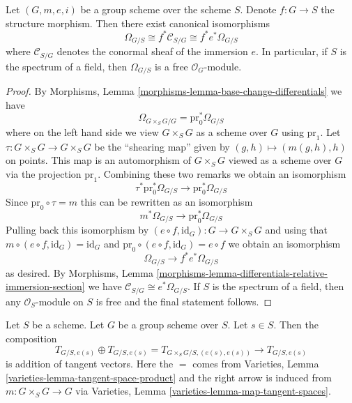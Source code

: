 \begin{lemma}
\label{lemma-group-scheme-module-differentials}
\begin{reference}
\cite[Proposition 3.15]{BookAV}
\end{reference}
Let $(G, m, e, i)$ be a group scheme over the scheme $S$.
Denote $f : G \to S$ the structure morphism.
Then there exist canonical isomorphisms
$$
\Omega_{G/S} \cong f^*\mathcal{C}_{S/G} \cong f^*e^*\Omega_{G/S}
$$
where $\mathcal{C}_{S/G}$ denotes the conormal sheaf of the
immersion $e$. In particular, if $S$ is the spectrum of a field, then
$\Omega_{G/S}$ is a free $\mathcal{O}_G$-module.
\end{lemma}

\begin{proof}
By Morphisms, Lemma \ref{morphisms-lemma-base-change-differentials} we have
$$
\Omega_{G \times_S G/G} = \text{pr}_0^*\Omega_{G/S}
$$
where on the left hand side we view $G \times_S G$ as a scheme over $G$
using $\text{pr}_1$.
Let $\tau : G \times_S G \to G \times_S G$ be the ``shearing map''
given by $(g, h) \mapsto (m(g, h), h)$ on points. This map is an automorphism
of $G \times_S G$ viewed as a scheme over $G$ via the projection $\text{pr}_1$.
Combining these two remarks we obtain an isomorphism
$$
\tau^*\text{pr}_0^*\Omega_{G/S} \to \text{pr}_0^*\Omega_{G/S}
$$
Since $\text{pr}_0 \circ \tau = m$ this can be rewritten as an isomorphism
$$
m^*\Omega_{G/S} \to \text{pr}_0^*\Omega_{G/S}
$$
Pulling back this isomorphism by
$(e \circ f, \text{id}_G) : G \to G \times_S G$
and using that $m \circ (e \circ f, \text{id}_G) = \text{id}_G$
and $\text{pr}_0 \circ (e \circ f, \text{id}_G) = e \circ f$
we obtain an isomorphism
$$
\Omega_{G/S} \to f^*e^*\Omega_{G/S}
$$
as desired. By
Morphisms, Lemma \ref{morphisms-lemma-differentials-relative-immersion-section}
we have $\mathcal{C}_{S/G} \cong e^*\Omega_{G/S}$.
If $S$ is the spectrum of a field, then
any $\mathcal{O}_S$-module on $S$ is free
and the final statement follows.
\end{proof}

\begin{lemma}
\label{lemma-group-scheme-addition-tangent-vectors}
Let $S$ be a scheme. Let $G$ be a group scheme over $S$.
Let $s \in S$. Then the composition
$$
T_{G/S, e(s)} \oplus T_{G/S, e(s)} = T_{G \times_S G/S, (e(s), e(s))}
\rightarrow T_{G/S, e(s)}
$$
is addition of tangent vectors. Here the $=$ comes from
Varieties, Lemma \ref{varieties-lemma-tangent-space-product}
and the right arrow is induced from $m : G \times_S G \to G$ via
Varieties, Lemma \ref{varieties-lemma-map-tangent-spaces}.
\end{lemma}

